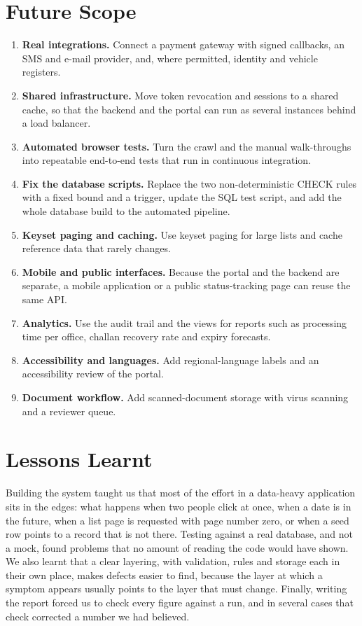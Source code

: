 \section{Future Scope}
\begin{enumerate}
\item \textbf{Real integrations.} Connect a payment gateway with signed callbacks, an SMS and e-mail provider, and, where permitted, identity and vehicle registers.
\item \textbf{Shared infrastructure.} Move token revocation and sessions to a shared cache, so that the backend and the portal can run as several instances behind a load balancer.
\item \textbf{Automated browser tests.} Turn the crawl and the manual walk-throughs into repeatable end-to-end tests that run in continuous integration.
\item \textbf{Fix the database scripts.} Replace the two non-deterministic CHECK rules with a fixed bound and a trigger, update the SQL test script, and add the whole database build to the automated pipeline.
\item \textbf{Keyset paging and caching.} Use keyset paging for large lists and cache reference data that rarely changes.
\item \textbf{Mobile and public interfaces.} Because the portal and the backend are separate, a mobile application or a public status-tracking page can reuse the same API.
\item \textbf{Analytics.} Use the audit trail and the views for reports such as processing time per office, challan recovery rate and expiry forecasts.
\item \textbf{Accessibility and languages.} Add regional-language labels and an accessibility review of the portal.
\item \textbf{Document workflow.} Add scanned-document storage with virus scanning and a reviewer queue.
\end{enumerate}

\section{Lessons Learnt}
Building the system taught us that most of the effort in a data-heavy application sits in the
edges: what happens when two people click at once, when a date is in the future, when a
list page is requested with page number zero, or when a seed row points to a record that
is not there. Testing against a real database, and not a mock, found problems that no
amount of reading the code would have shown. We also learnt that a clear layering, with
validation, rules and storage each in their own place, makes defects easier to find, because
the layer at which a symptom appears usually points to the layer that must change. Finally,
writing the report forced us to check every figure against a run, and in several cases
that check corrected a number we had believed.
